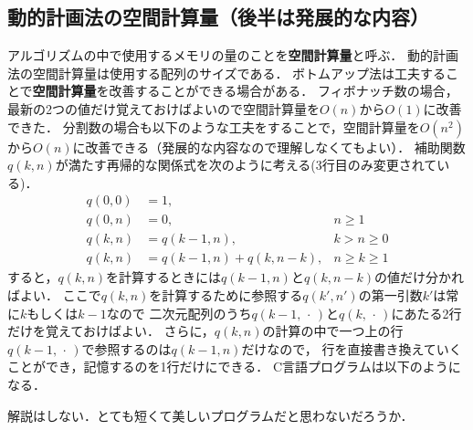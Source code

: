 \documentclass[a4paper,twoside,onecolumn,openany,article]{memoir}
\theoremstyle{remark}
\begin{document}
\subsection{動的計画法の空間計算量（後半は発展的な内容）}\label{sec:space}
アルゴリズムの中で使用するメモリの量のことを\textbf{空間計算量}と呼ぶ．
動的計画法の空間計算量は使用する配列のサイズである．
ボトムアップ法は工夫することで\textbf{空間計算量}を改善することができる場合がある．
フィボナッチ数の場合，最新の2つの値だけ覚えておけばよいので空間計算量を$O(n)$から$O(1)$に改善できた．
分割数の場合も以下のような工夫をすることで，空間計算量を$O(n^2)$から$O(n)$に改善できる（発展的な内容なので理解しなくてもよい）．
補助関数$q(k,n)$が満たす再帰的な関係式を次のように考える(3行目のみ変更されている)．
\begin{align*}
q(0,0) &= 1,\\
q(0,n) &= 0,& n \ge 1\\
q(k,n) &= q(k-1,n),& k > n \ge 0\\
q(k,n) &= q(k-1,n) + q(k, n-k),& n\ge k\ge 1
\end{align*}
すると，$q(k,n)$を計算するときには$q(k-1,n)$と$q(k,n-k)$の値だけ分かればよい．
ここで$q(k,n)$を計算するために参照する$q(k',n')$の第一引数$k'$は常に$k$もしくは$k-1$なので
二次元配列のうち$q(k-1,\,\cdot\,)$と$q(k,\,\cdot\,)$にあたる2行だけを覚えておけばよい．
さらに，$q(k,n)$の計算の中で一つ上の行$q(k-1,\,\cdot\,)$で参照するのは$q(k-1,n)$だけなので，
行を直接書き換えていくことができ，記憶するのを1行だけにできる．
C言語プログラムは以下のようになる．

解説はしない．とても短くて美しいプログラムだと思わないだろうか．

\end{document}
